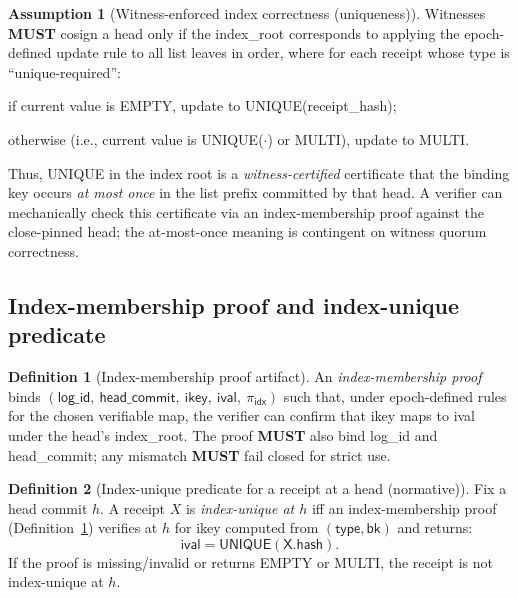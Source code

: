 \documentclass[11pt]{article}
\newcommand{\MUST}{\textbf{MUST}}
\newcommand{\term}[1]{\emph{#1}}
\newcommand{\1}{\mathbf{1}}
\theoremstyle{definition}
\newtheorem{definition}{Definition}
\newtheorem{assumption}{Assumption}
\theoremstyle{plain}
\begin{document}
\begin{assumption}[Witness-enforced index correctness (uniqueness)]
\label{ass:index_correct}
Witnesses \MUST{} cosign a head only if the \textsf{index\_root} corresponds to applying the epoch-defined update rule to all list leaves in order, where for each receipt whose type is ``unique-required'':
\begin{tightitemize}
\item if current value is \textsf{EMPTY}, update to \textsf{UNIQUE}(\textsf{receipt\_hash});
\item otherwise (i.e., current value is \textsf{UNIQUE}(\ensuremath{\cdot}) or \textsf{MULTI}), update to \textsf{MULTI}.
\end{tightitemize}
Thus, \textsf{UNIQUE} in the index root is a \emph{witness-certified} certificate that the binding key occurs \emph{at most once} in the list prefix committed by that head. A verifier can mechanically check this certificate via an index-membership proof against the close-pinned head; the at-most-once meaning is contingent on witness quorum correctness.
\end{assumption}

\subsection{Index-membership proof and index-unique predicate}

\begin{definition}[Index-membership proof artifact]
\label{def:idx_proof}
An \term{index-membership proof} binds
$(\textsf{log\_id},\ \textsf{head\_commit},\ \textsf{ikey},\ \textsf{ival},\ \pi_{\textsf{idx}})$
such that, under epoch-defined rules for the chosen verifiable map, the verifier can confirm that \textsf{ikey} maps to \textsf{ival} under the head's \textsf{index\_root}. The proof \MUST{} also bind \textsf{log\_id} and \textsf{head\_commit}; any mismatch \MUST{} fail closed for strict use.
\end{definition}

\begin{definition}[Index-unique predicate for a receipt at a head (normative)]
\label{def:index_unique}
Fix a head commit $h$.
A receipt $X$ is \term{index-unique at $h$} iff an index-membership proof (Definition~\ref{def:idx_proof}) verifies at $h$ for \textsf{ikey} computed from $(\textsf{type},\textsf{bk})$ and returns:
\[
\textsf{ival}=\textsf{UNIQUE}(\textsf{X.hash}).
\]
If the proof is missing/invalid or returns \textsf{EMPTY} or \textsf{MULTI}, the receipt is not index-unique at $h$.
\end{definition}
\end{document}
